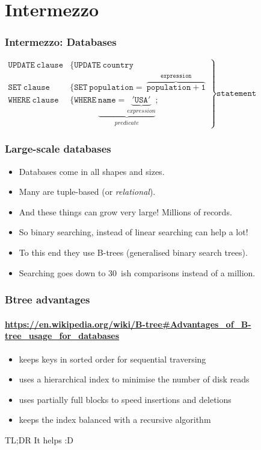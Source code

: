\section{Intermezzo}
\label{sec:intermezzo}

\begin{frame}
	\frametitle{Intermezzo: Databases}

	$\left. 
		\begin{array}{rl} 
			\scriptstyle\mathtt{UPDATE~clause} & \{ \mathtt{UPDATE\ country} \\
				\scriptstyle\mathtt{SET~clause} & \{ \mathtt{SET\ population =~} \overbrace{\mathtt{population + 1}}^\mathtt{expression} \\ 
				\scriptstyle\mathtt{WHERE~clause} & \{ \mathtt{WHERE}\ \underbrace{\mathtt{name =} \underbrace{\mathtt{'USA'}}_{expression}}_{predicate};
		\end{array}
	\right\} \scriptstyle\texttt{statement}$
\end{frame}

\begin{frame}
	\frametitle{Large-scale databases}
	\begin{itemize}
		\item Databases come in all shapes and sizes.
			\pause
		\item Many are tuple-based (or \textit{relational}).
			\pause
		\item And these things can grow very large! Millions of records.
			\pause
		\item So binary searching, instead of linear searching can help a lot!
			\pause
		\item To this end they use B-trees (generalised binary search trees).
			\pause
		\item Searching goes down to 30~ish comparisons instead of a million.
	\end{itemize}
	
\end{frame}

\begin{frame}
	\frametitle{Btree advantages}
	\framesubtitle{\url{https://en.wikipedia.org/wiki/B-tree\#Advantages\_of\_B-tree_usage_for_databases}}
	\begin{itemize}
		\item keeps keys in sorted order for sequential traversing
		\item uses a hierarchical index to minimise the number of disk reads
		\item uses partially full blocks to speed insertions and deletions
		\item keeps the index balanced with a recursive algorithm
	\end{itemize}
	\pause
	\begin{block}{TL;DR}
		It helps :D
	\end{block}	
\end{frame}
